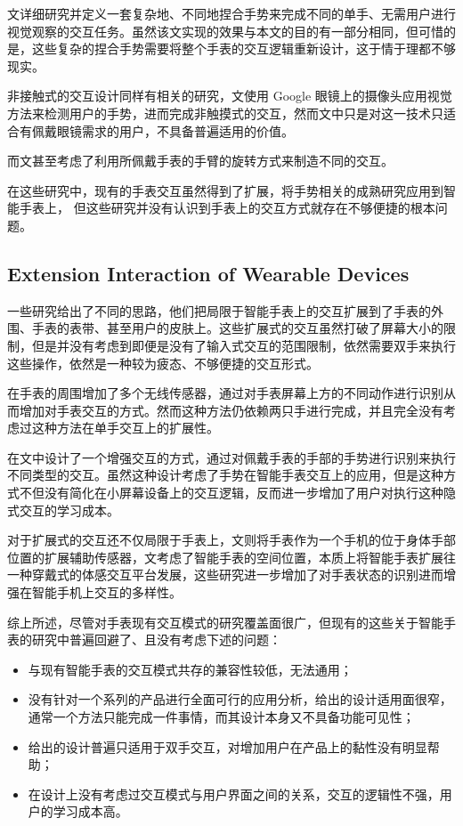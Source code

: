 文\cite{loclair2010pinchwatch}详细研究并定义一套复杂地、不同地捏合手势来完成不同的单手、无需用户进行视觉观察的交互任务。虽然该文实现的效果与本文的目的有一部分相同，但可惜的是，这些复杂的捏合手势需要将整个手表的交互逻辑重新设计，这于情于理都不够现实。

非接触式的交互设计同样有相关的研究，文\cite{lv2015extending}使用 Google 眼镜上的摄像头应用视觉方法来检测用户的手势，进而完成非触摸式的交互，然而文中只是对这一技术只适合有佩戴眼镜需求的用户，不具备普遍适用的价值。

而文\cite{Kerber:2015:WPM:2836041.2836063}甚至考虑了利用所佩戴手表的手臂的旋转方式来制造不同的交互。

在这些研究中，现有的手表交互虽然得到了扩展，将手势相关的成熟研究应用到智能手表上，
但这些研究并没有认识到手表上的交互方式就存在不够便捷的根本问题。

\subsection{Extension Interaction of Wearable Devices}

一些研究给出了不同的思路，他们把局限于智能手表上的交互扩展到了手表的外围\cite{Knibbe:2014:EIS:2559206.2581315,Kratz:2009:HEA:1613858.1613912}、手表的表带\cite{Perrault:2013:WSG:2470654.2466192}、甚至用户的皮肤上\cite{Ogata:2015:SSG:2735711.2735830}。这些扩展式的交互虽然打破了屏幕大小的限制，但是并没有考虑到即便是没有了输入式交互的范围限制，依然需要双手来执行这些操作，依然是一种较为疲态、不够便捷的交互形式。

\cite{kim2007gesture}在手表的周围增加了多个无线传感器，通过对手表屏幕上方的不同动作进行识别从而增加对手表交互的方式。然而这种方法仍依赖两只手进行完成，并且完全没有考虑过这种方法在单手交互上的扩展性。

在文\cite{Yang:2015:EST:2815585.2815724}中设计了一个增强交互的方式，通过对佩戴手表的手部的手势进行识别来执行不同类型的交互。虽然这种设计考虑了手势在智能手表交互上的应用，但是这种方式不但没有简化在小屏幕设备上的交互逻辑，反而进一步增加了用户对执行这种隐式交互的学习成本。

对于扩展式的交互还不仅局限于手表上，文\cite{Chen:2014:DEJ:2556288.2556955}则将手表作为一个手机的位于身体手部位置的扩展辅助传感器，文\cite{Yang:2014:MIS:2638728.2638848}考虑了智能手表的空间位置，本质上将智能手表扩展往一种穿戴式的体感交互平台发展\cite{fuquanjun2015}，这些研究进一步增加了对手表状态的识别进而增强在智能手机上交互的多样性。

综上所述，尽管对手表现有交互模式的研究覆盖面很广，但现有的这些关于智能手表的研究中普遍回避了、且没有考虑下述的问题：
\begin{itemize}
    \kaishu
    \item 与现有智能手表的交互模式共存的兼容性较低，无法通用；
    \item 没有针对一个系列的产品进行全面可行的应用分析，给出的设计适用面很窄，通常一个方法只能完成一件事情，而其设计本身又不具备功能可见性；
    \item 给出的设计普遍只适用于双手交互，对增加用户在产品上的黏性没有明显帮助；
    \item 在设计上没有考虑过交互模式与用户界面之间的关系，交互的逻辑性不强，用户的学习成本高。
\end{itemize}
